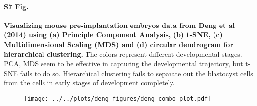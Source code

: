 \documentclass[10pt,letterpaper]{article}
\begin{document}
\paragraph*{S7 Fig.}

\label{figS7}
{\bf Visualizing mouse pre-implantation embryos data from Deng et al (2014) using (a) Principle Component Analysis, (b) t-SNE, (c) Multidimensional Scaling (MDS) and (d) circular dendrogram for hierarchical clustering.} The colors represent different developmental stages. PCA, MDS seem to be effective in capturing the developmental trajectory, but t-SNE fails to do so. Hierarchical clustering fails to separate out the blastocyst cells from the cells in early stages of development completely.

\begin{figure}[ht]
\centering
\texttt{[image: ../../plots/deng-figures/deng-combo-plot.pdf]}
\end{figure}
\end{document}

